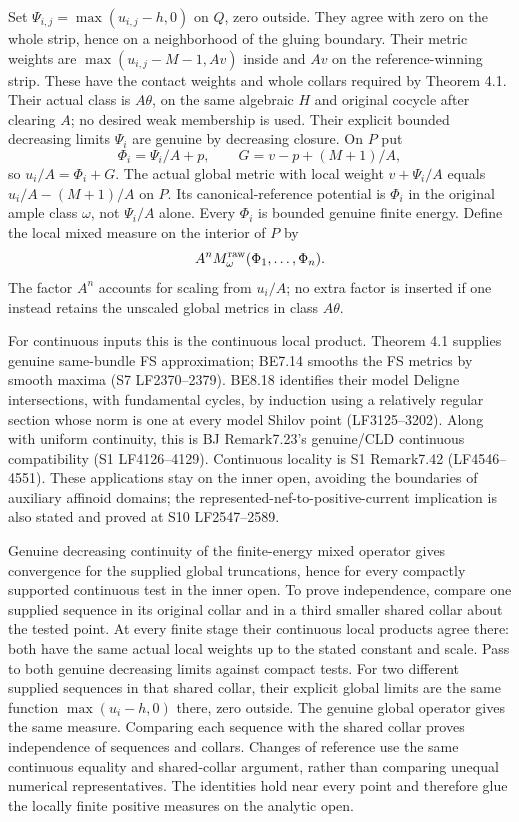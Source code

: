 \documentclass[
  10pt,
]{article}
\begin{document}
Set \(\Psi_{i,j}=\max(u_{i,j}-h,0)\) on \(Q\), zero outside. They agree
with zero on the whole strip, hence on a neighborhood of the gluing
boundary. Their metric weights are \(\max(u_{i,j}-M-1,Av)\) inside and
\(Av\) on the reference-winning strip. These have the contact weights
and whole collars required by Theorem 4.1. Their actual class is
\(A\theta\), on the same algebraic \(H\) and original cocycle after
clearing \(A\); no desired weak membership is used. Their explicit
bounded decreasing limits \(\Psi_i\) are genuine by decreasing closure.
On \(P\) put \[\Phi_i=\Psi_i/A+p,\qquad G=v-p+(M+1)/A,\] so
\(u_i/A=\Phi_i+G\). The actual global metric with local weight
\(v+\Psi_i/A\) equals \(u_i/A-(M+1)/A\) on \(P\). Its
canonical-reference potential is \(\Phi_i\) in the original ample class
\(\omega\), not \(\Psi_i/A\) alone. Every \(\Phi_i\) is bounded genuine
finite energy. Define the local mixed measure on the interior of \(P\)
by \[A^n M^{\rm raw}_\omega(\Phi_1,\ldots,\Phi_n).\] The factor \(A^n\)
accounts for scaling from \(u_i/A\); no extra factor is inserted if one
instead retains the unscaled global metrics in class \(A\theta\).

For continuous inputs this is the continuous local product. Theorem 4.1
supplies genuine same-bundle FS approximation; BE7.14 smooths the FS
metrics by smooth maxima (S7 LF2370--2379). BE8.18 identifies their
model Deligne intersections, with fundamental cycles, by induction using
a relatively regular section whose norm is one at every model Shilov
point (LF3125--3202). Along with uniform continuity, this is BJ
Remark7.23's genuine/CLD continuous compatibility (S1 LF4126--4129).
Continuous locality is S1 Remark7.42 (LF4546--4551). These applications
stay on the inner open, avoiding the boundaries of auxiliary affinoid
domains; the represented-nef-to-positive-current implication is also
stated and proved at S10 LF2547--2589.

Genuine decreasing continuity of the finite-energy mixed operator gives
convergence for the supplied global truncations, hence for every
compactly supported continuous test in the inner open. To prove
independence, compare one supplied sequence in its original collar and
in a third smaller shared collar about the tested point. At every finite
stage their continuous local products agree there: both have the same
actual local weights up to the stated constant and scale. Pass to both
genuine decreasing limits against compact tests. For two different
supplied sequences in that shared collar, their explicit global limits
are the same function \(\max(u_i-h,0)\) there, zero outside. The genuine
global operator gives the same measure. Comparing each sequence with the
shared collar proves independence of sequences and collars. Changes of
reference use the same continuous equality and shared-collar argument,
rather than comparing unequal numerical representatives. The identities
hold near every point and therefore glue the locally finite positive
measures on the analytic open.
\end{document}
